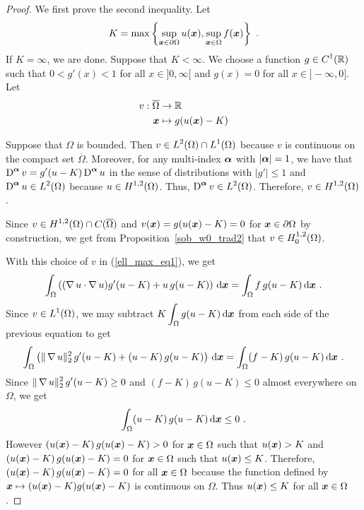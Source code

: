 \begin{proof}
 We first prove the second inequality.  Let
\[
K = \max\left\{ \sup_{{\bm{x}}\in \partial \Omega} u({\bm{x}}),
\sup_{{\bm{x}}\in \Omega} f({\bm{x}}) \right\} \ .
\]
If $K=\infty$, we are done.  Suppose that $K<\infty$.
We choose a function $\displaystyle g\in C^1(\mathbb{R})$ such that
$0< g'(x) < 1$ for all $x\in ]0,\infty[$ and $g(x)=0$ for all
$x\in]-\infty,0]$.  Let
\begin{align*}
v: \overline{\Omega} & \rightarrow \mathbb{R} \\
{\bm{x}} &\mapsto g(u({\bm{x}})-K)
\end{align*}

Suppose that $\Omega$ is bounded.  Then
$\displaystyle v \in L^2(\Omega) \cap L^1(\Omega)$ because
$v$ is continuous on the compact set $\overline{\Omega}$.  Moreover,
for any multi-index ${\bm{\alpha}}$ with $|{\bm{\alpha}}|=1$, we have that
$\displaystyle \operatorname{D}^{{\bm{\alpha}}} v = g'(u-K) \operatorname{D}^{{\bm{\alpha}}} u$
in the sense of distributions with $|g'|\leq 1$ and
$\displaystyle \operatorname{D}^{{\bm{\alpha}}} u\in L^2(\Omega)$
because $\displaystyle u \in H^{1,2}(\Omega)$.  Thus,
$\displaystyle \operatorname{D}^{{\bm{\alpha}}} v \in L^2(\Omega)$.
Therefore, $\displaystyle v\in H^{1,2}(\Omega)$.

Since $\displaystyle v\in H^{1,2}(\Omega) \cap C(\overline{\Omega})$ and
$v({\bm{x}}) = g(u({\bm{x}})-K) = 0$ for ${\bm{x}}\in \partial \Omega$ by
construction, we get from Proposition~\ref{sob_w0_trad2} that
$\displaystyle v\in H^{1,2}_0(\Omega)$.

With this choice of $v$ in (\ref{ell_max_eq1}), we get
\[
\int_\Omega \left( (\operatorname{\nabla} u \cdot \operatorname{\nabla} u ) g'(u-K) 
+ u \, g(u-K) \right) \,\mathrm{d}{{\bm{x}}} = \int_\Omega f\,g(u-K)
\,\mathrm{d}{{\bm{x}}} \ .
\]
Since $\displaystyle v \in L^1(\Omega)$, we may subtract
$\displaystyle K \int_{\Omega} g(u-K) \,\mathrm{d}{{\bm{x}}}$ from each side of
the previous equation to get
\[
\int_\Omega \left( \|\operatorname{\nabla} u \|_2^2\, g'(u-K) 
+ (u-K) \, g(u-K) \right) \,\mathrm{d}{{\bm{x}}} = \int_\Omega (f-K)\,g(u-K)
\,\mathrm{d}{{\bm{x}}} \ .
\]
Since $\displaystyle \|\operatorname{\nabla} u \|_2^2\, g'(u-K)\geq 0$ and
$(f-K) \, g(u-K)\leq 0$ almost everywhere on $\Omega$, we get
\[
\int_\Omega (u-K) \, g(u-K) \,\mathrm{d}{{\bm{x}}} \leq 0 \ .
\]
However $(u({\bm{x}})-K) \, g(u({\bm{x}})-K) > 0$ for
${\bm{x}} \in \Omega$ such that $u({\bm{x}})>K$ and
$(u({\bm{x}})-K) \, g(u({\bm{x}})-K) = 0$ for
${\bm{x}} \in \Omega$ such that $u({\bm{x}})\leq K$.  Therefore,
$(u({\bm{x}})-K) \, g(u({\bm{x}})-K) = 0$ for all ${\bm{x}}\in \Omega$
because the function defined by
${\bm{x}} \mapsto (u({\bm{x}}) - K) g(u({\bm{x}}) -K)$ is
continuous on $\Omega$.
Thus $u({\bm{x}}) \leq K$ for all ${\bm{x}}\in \Omega$.


\end{proof}
